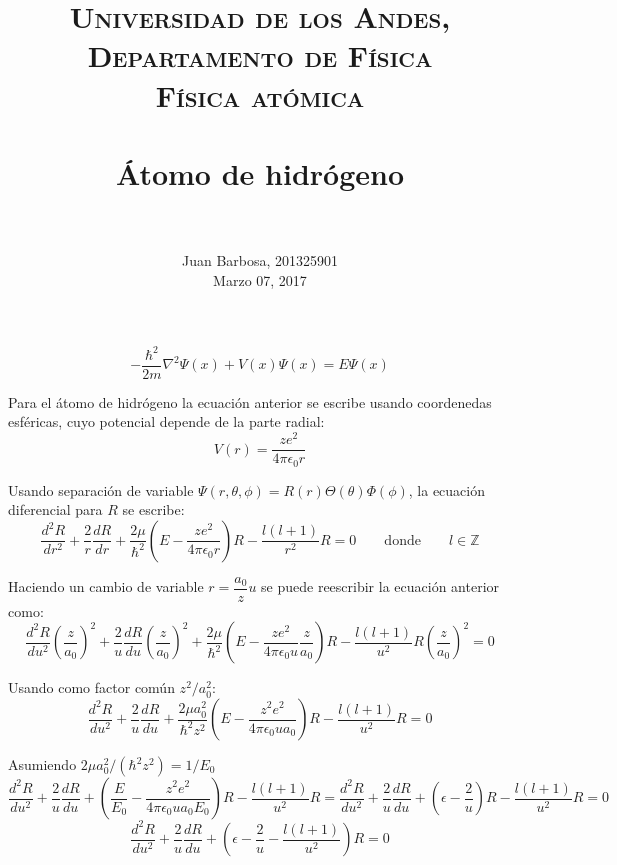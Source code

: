 \documentclass[paper=letter, fontsize=11pt]{scrartcl}
\title{
        \usefont{OT1}{bch}{b}{n}
        \normalfont \normalsize \textsc{Universidad de los Andes, Departamento de F\'isica \\
        F\'isica at\'omica} \\ [25pt]
        \horrule{0.5pt} \\[0.4cm]
        \huge \'Atomo de hidr\'ogeno \\
        \horrule{2pt} \\[0.5cm]
}
\author{
        \normalfont                                 \normalsize
        Juan Barbosa, 201325901\\[-3pt]      \normalsize
        Marzo 07, 2017
}
\date{}
\begin{document}
\maketitle

\[
\boxed{-\dfrac{\hbar^2}{2m}\nabla^2\Psi(x) + V(x)\Psi(x) = E\Psi(x)}
\]

Para el \'atomo de hidr\'ogeno la ecuaci\'on anterior se escribe usando coordenedas esf\'ericas, cuyo potencial depende de la parte radial:
\begin{equation}
	V(r) = \dfrac{ze^2}{4\pi\epsilon_0r}
\end{equation}

Usando separaci\'on de variable $\Psi(r, \theta, \phi) = R(r)\Theta(\theta)\Phi(\phi)$, la ecuaci\'on diferencial para $R$ se escribe:
\begin{equation}
	\dfrac{d^2R}{dr^2} + \dfrac{2}{r}\dfrac{dR}{dr} + \dfrac{2\mu}{\hbar^2}\left(E - \dfrac{ze^2}{4\pi\epsilon_0r}\right)R - \dfrac{l(l+1)}{r^2}R = 0
	\qquad \text{donde} \qquad l\in\mathbb{Z}	
\end{equation}

Haciendo un cambio de variable $r=\dfrac{a_0}{z}u$ se puede reescribir la ecuaci\'on anterior como:
\begin{equation}
	\dfrac{d^2R}{du^2}\left(\dfrac{z}{a_0}\right)^2 + \dfrac{2}{u}\dfrac{dR}{du}\left(\dfrac{z}{a_0}\right)^2+\dfrac{2\mu}{\hbar^2}\left(E - \dfrac{ze^2}{4\pi\epsilon_0u}\dfrac{z}{a_0}\right)R - \dfrac{l(l+1)}{u^2}R\left(\dfrac{z}{a_0}\right)^2 = 0
\end{equation}

Usando como factor com\'un $z^2/a_0^2$:
\begin{equation}
	\dfrac{d^2R}{du^2} + \dfrac{2}{u}\dfrac{dR}{du} + \dfrac{2\mu a_0^2}{\hbar^2z^2}\left(E - \dfrac{z^2e^2}{4\pi\epsilon_0ua_0}\right)R - \dfrac{l(l+1)}{u^2}R = 0
\end{equation}

Asumiendo $2\mu a_0^2/(\hbar^2z^2) = 1/E_0$
\begin{equation}
	\dfrac{d^2R}{du^2} + \dfrac{2}{u}\dfrac{dR}{du} + \left(\dfrac{E}{E_0} - \dfrac{z^2e^2}{4\pi\epsilon_0ua_0E_0}\right)R - \dfrac{l(l+1)}{u^2}R = \dfrac{d^2R}{du^2} + \dfrac{2}{u}\dfrac{dR}{du} + \left(\epsilon - \dfrac{2}{u}\right)R - \dfrac{l(l+1)}{u^2}R = 0
\end{equation}
\begin{equation}
	\dfrac{d^2R}{du^2} + \dfrac{2}{u}\dfrac{dR}{du} + \left(\epsilon - \dfrac{2}{u} - \dfrac{l(l+1)}{u^2}\right)R = 0
\end{equation}
\end{document}
